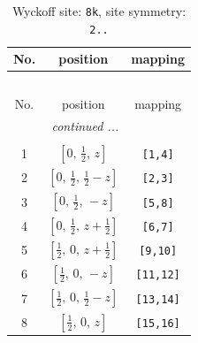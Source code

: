 \documentclass[fleqn,8pt]{jsarticle}
\begin{document}
\renewcommand{\arraystretch}{1.2}
\begin{longtable}{ccc}
\caption{Wyckoff site: {\tt 8k}, site symmetry: {\tt 2..}}
 \\
 \hline \hline
No. & position & mapping \\ \hline \endfirsthead

\multicolumn{2}{l}{\tablename\ \thetable{}} \\
 \hline \hline
No. & position & mapping \\ \hline \endhead

 \hline \hline
\multicolumn{2}{r}{\footnotesize\it continued ...} \\ \endfoot

 \hline \hline
\multicolumn{2}{r}{} \\ \endlastfoot

1 & $\left[ 0,\, \frac{1}{2},\, z \right]$ & {\tt [1,4]} \\ \hline
2 & $\left[ 0,\, \frac{1}{2},\, \frac{1}{2} - z \right]$ & {\tt [2,3]} \\ \hline
3 & $\left[ 0,\, \frac{1}{2},\, - z \right]$ & {\tt [5,8]} \\ \hline
4 & $\left[ 0,\, \frac{1}{2},\, z + \frac{1}{2} \right]$ & {\tt [6,7]} \\ \hline
5 & $\left[ \frac{1}{2},\, 0,\, z + \frac{1}{2} \right]$ & {\tt [9,10]} \\ \hline
6 & $\left[ \frac{1}{2},\, 0,\, - z \right]$ & {\tt [11,12]} \\ \hline
7 & $\left[ \frac{1}{2},\, 0,\, \frac{1}{2} - z \right]$ & {\tt [13,14]} \\ \hline
8 & $\left[ \frac{1}{2},\, 0,\, z \right]$ & {\tt [15,16]} \\
\end{longtable}
\renewcommand{\arraystretch}{1.2}
\end{document}
